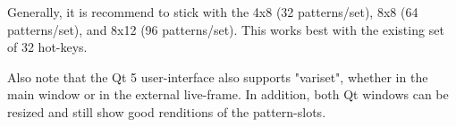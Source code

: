    Generally, it is recommend to stick with the 4x8 (32 patterns/set),
   8x8 (64 patterns/set), and 8x12 (96 patterns/set).  This works best with the
   existing set of 32 hot-keys.

   Also note that the Qt 5 user-interface also supports "variset", whether in
   the main window or in the external live-frame.  In addition, both Qt windows
   can be resized and still show good renditions of the pattern-slots.

